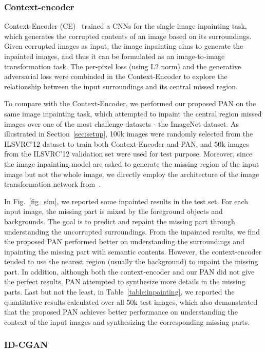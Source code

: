 \documentclass{article}
\begin{document}
\subsubsection{Context-encoder}

Context-Encoder (CE)~\cite{pathak2016context} trained a CNNs for the single image inpainting task, which generates the corrupted contents of an image based on its surroundings. Given corrupted images as input, the image inpainting aims to generate the inpainted images, and thus it can be formulated as an image-to-image transformation task. The per-pixel loss (using L2 norm) and the generative adversarial loss were combinded in the Context-Encoder to explore the relationship between the input surroundings and its central missed region.

To compare with the Context-Encoder, we performed our proposed PAN on the same image inpainting task, which attempted to inpaint the central region missed images over one of the most challenge datasets - the ImageNet dataset. As illustrated in Section~\ref{sec:setup}, 100k images were randomly selected from the ILSVRC'12 dataset to train both Context-Encoder and PAN, and 50k images from the ILSVRC'12 validation set were used for test purpose. Moreover, since the image inpainting model are asked to generate the missing region of the input image but not the whole image, we directly employ the architecture of the image transformation network from~\cite{pathak2016context}.

In Fig.~\ref{fig_sim}, we reported some inpainted results in the test set. For each input image, the missing part is mixed by the foreground objects and backgrounds. The goal is to predict and repaint the missing part through understanding the uncorrupted surroundings. From the inpainted results, we find the proposed PAN performed better on understanding the surroundings and inpainting the missing part with semantic contents. However, the context-encoder tended to use the nearest region (usually the background) to inpaint the missing part. In addition, although both the context-encoder and our PAN did not give the perfect results, PAN attempted to synthesize more details in the missing parts. Last but not the least, in Table~\ref{table:inpainting}, we reported the quantitative results calculated over all 50k test images, which also demonstrated that the proposed PAN achieves better performance on understanding the context of the input images and synthesizing the corresponding missing parts.

\subsubsection{ID-CGAN}
\end{document}
